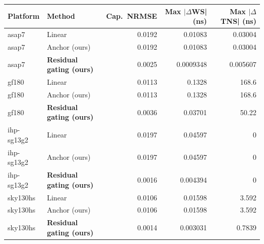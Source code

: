 \small
\begin{tabular}{llrrr}\toprule
Platform & Method & Cap.\ NRMSE & Max $|\Delta$WS| (ns) & Max $|\Delta$TNS| (ns) \\\midrule
asap7 & Linear & 0.0192 & 0.01083 & 0.03004 \\
asap7 & Anchor (ours) & 0.0192 & 0.01083 & 0.03004 \\
asap7 & \textbf{Residual gating (ours)} & 0.0025 & 0.0009348 & 0.005607 \\
\addlinespace
gf180 & Linear & 0.0113 & 0.1328 & 168.6 \\
gf180 & Anchor (ours) & 0.0113 & 0.1328 & 168.6 \\
gf180 & \textbf{Residual gating (ours)} & 0.0036 & 0.03701 & 50.22 \\
\addlinespace
ihp-sg13g2 & Linear & 0.0197 & 0.04597 & 0 \\
ihp-sg13g2 & Anchor (ours) & 0.0197 & 0.04597 & 0 \\
ihp-sg13g2 & \textbf{Residual gating (ours)} & 0.0016 & 0.004394 & 0 \\
\addlinespace
sky130hs & Linear & 0.0106 & 0.01598 & 3.592 \\
sky130hs & Anchor (ours) & 0.0106 & 0.01598 & 3.592 \\
sky130hs & \textbf{Residual gating (ours)} & 0.0014 & 0.003031 & 0.7839 \\
\bottomrule\end{tabular}
